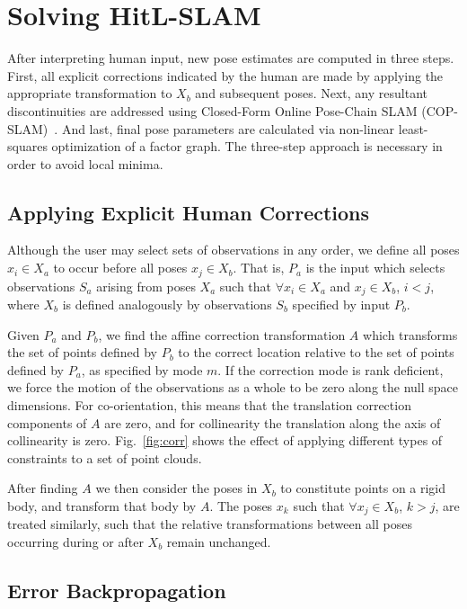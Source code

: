 \documentclass[letterpaper]{article} %
\newcommand{\figref}[1]{Fig.~\ref{fig:#1}}
\theoremstyle{definition}
\begin{document}
\section{Solving HitL-SLAM}

After interpreting human input, new pose estimates are computed in three steps.
First, all explicit corrections indicated by the human are made by applying the
appropriate transformation to $X_b$ and subsequent poses. Next, any resultant
discontinuities are addressed using Closed-Form Online Pose-Chain SLAM
(COP-SLAM)~\cite{copslam}. And last, final pose parameters are calculated via
non-linear least-squares optimization of a factor graph. The three-step approach
is necessary in order to avoid local minima.

\subsection{Applying Explicit Human Corrections}

Although the user may select sets of observations in any order, we define all poses $x_i \in X_a$ to occur before all poses $x_j \in X_b$. That is, $P_a$ is the input which selects observations $S_a$ arising from poses $X_a$ such that $\forall x_i \in X_a$ and $x_j \in X_b$, $i < j$, where $X_b$ is defined analogously by observations $S_b$ specified by input $P_b$.

Given $P_a$ and $P_b$, we find the affine correction transformation $A$ which
transforms the set of points defined by $P_b$ to the correct location relative
to the set of points defined by $P_a$, as specified by mode $m$. If the
correction mode is rank deficient, we force the motion of the observations as a
whole to be zero along the null space dimensions. For co-orientation, this means
that the translation correction components of $A$ are zero, and for
collinearity the translation along the axis of collinearity is zero.
\figref{corr} shows the effect of applying different types of constraints to a
set of point clouds.

After finding $A$ we then consider the poses in $X_b$ to constitute points on a rigid body, and transform that body by $A$. The poses $x_k$ such that $\forall x_j \in X_b$, $k > j$, are treated similarly, such that the relative transformations between all poses occurring during or after $X_b$ remain unchanged.

\subsection{Error Backpropagation}
\end{document}
